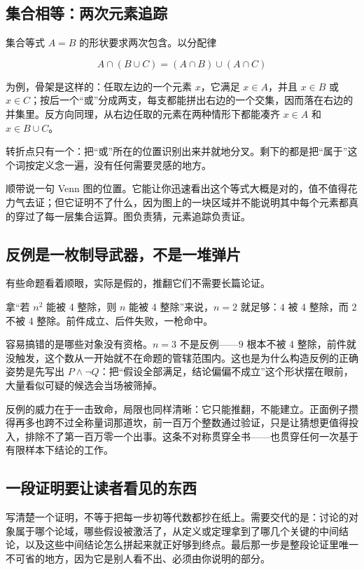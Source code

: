 \subsection{集合相等：两次元素追踪}

集合等式 \(A=B\) 的形状要求两次包含。以分配律

\[
A\cap(B\cup C)=(A\cap B)\cup(A\cap C)
\]

为例，骨架是这样的：任取左边的一个元素 \(x\)，它满足 \(x\in A\)，并且 \(x\in B\) 或 \(x\in C\)；按后一个``或''分成两支，每支都能拼出右边的一个交集，因而落在右边的并集里。反方向同理，从右边任取的元素在两种情形下都能凑齐 \(x\in A\) 和 \(x\in B\cup C\)。

转折点只有一个：把``或''所在的位置识别出来并就地分叉。剩下的都是把``属于''这个词按定义念一遍，没有任何需要灵感的地方。

顺带说一句 Venn 图的位置。它能让你迅速看出这个等式大概是对的，值不值得花力气去证；但它证明不了什么，因为图上的一块区域并不能说明其中每个元素都真的穿过了每一层集合运算。图负责猜，元素追踪负责证。

\subsection{反例是一枚制导武器，不是一堆弹片}

有些命题看着顺眼，实际是假的，推翻它们不需要长篇论证。

拿``若 \(n^2\) 能被 4 整除，则 \(n\) 能被 4 整除''来说，\(n=2\) 就足够：\(4\) 被 4 整除，而 2 不被 4 整除。前件成立、后件失败，一枪命中。

容易搞错的是哪些对象没有资格。\(n=3\) 不是反例——\(9\) 根本不被 4 整除，前件就没触发，这个数从一开始就不在命题的管辖范围内。这也是为什么构造反例的正确姿势是先写出 \(P\land\neg Q\)：把``假设全部满足，结论偏偏不成立''这个形状摆在眼前，大量看似可疑的候选会当场被筛掉。

反例的威力在于一击致命，局限也同样清晰：它只能推翻，不能建立。正面例子攒得再多也跨不过全称量词那道坎，前一百万个整数通过验证，只是让猜想更值得投入，排除不了第一百万零一个出事。这条不对称贯穿全书——也贯穿任何一次基于有限样本下结论的工作。

\subsection{一段证明要让读者看见的东西}

写清楚一个证明，不等于把每一步初等代数都抄在纸上。需要交代的是：讨论的对象属于哪个论域，哪些假设被激活了，从定义或定理拿到了哪几个关键的中间结论，以及这些中间结论怎么拼起来就正好够到终点。最后那一步是整段论证里唯一不可省的地方，因为它是别人看不出、必须由你说明的部分。


